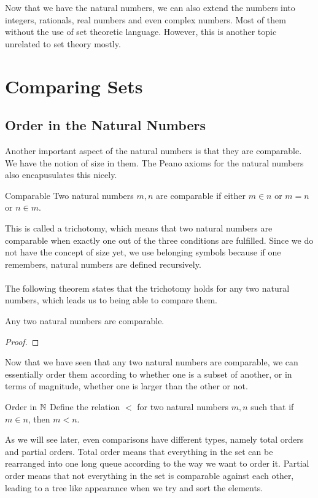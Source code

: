 \documentclass[a4paper]{article}
\begin{document}
Now that we have the natural numbers, we can also extend the numbers into integers, rationals, real numbers and even complex numbers. Most of them without the use of set theoretic language. However, this is another topic unrelated to set theory mostly. 

\pagebreak
\section{Comparing Sets}
\subsection{Order in the Natural Numbers}
Another important aspect of the natural numbers is that they are comparable. We have the notion of size in them. The Peano axioms for the natural numbers also encapusulates this nicely. 
\begin{defn}{Comparable}{} Two natural numbers $m,n$ are comparable if either $m\in n$ or $m=n$ or $n\in m$. 
\end{defn}

This is called a trichotomy, which means that two natural numbers are comparable when exactly one out of the three conditions are fulfilled. Since we do not have the concept of size yet, we use belonging symbols because if one remembers, natural numbers are defined recursively. \\~\\
The following theorem states that the trichotomy holds for any two natural numbers, which leads us to being able to compare them. 

\begin{thm}{}{} Any two natural numbers are comparable. \tcbline
\begin{proof}
\end{proof}
\end{thm}

Now that we have seen that any two natural numbers are comparable, we can essentially order them according to whether one is a subset of another, or in terms of magnitude, whether one is larger than the other or not. 

\begin{defn}{Order in $\mathbb{N}$}{} Define the relation $<$ for two natural numbers $m,n$ such that if $m\in n$, then $m<n$. 
\end{defn}

As we will see later, even comparisons have different types, namely total orders and partial orders. Total order means that everything in the set can be rearranged into one long queue according to the way we want to order it. Partial order means that not everything in the set is comparable against each other, leading to a tree like appearance when we try and sort the elements. 
\end{document}
